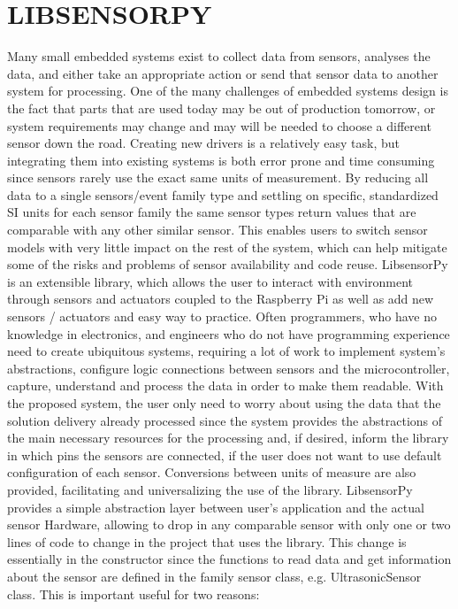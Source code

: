 \documentclass{acm_proc_article-sp}
\begin{document}
\section{LIBSENSORPY}
\label{sec:proposedModel}
Many small embedded systems exist to collect data from sensors, analyses the data, and either take an appropriate action or send that sensor data to another system for processing. One of the many challenges of embedded systems design is the fact that parts that are used today may be out of production tomorrow, or system requirements may change and may will be needed to choose a different sensor down the road.
\newline
\newline
Creating new drivers is a relatively easy task, but integrating them into existing systems is both error prone and time consuming since sensors rarely use the exact same units of measurement. By reducing all data to a single sensors/event family type and settling on specific, standardized SI units for each sensor family the same sensor types return values that are comparable with any other similar sensor. This enables users to switch sensor models with very little impact on the rest of the system, which can help mitigate some of the risks and problems of sensor availability and code reuse.
\newline
\newline
LibsensorPy is an extensible library, which allows the user to interact with environment through sensors and actuators coupled to the Raspberry Pi as well as add new sensors / actuators and easy way to practice. Often programmers, who have no knowledge in electronics, and engineers who do not have programming experience need to create ubiquitous systems, requiring a lot of work to implement system's abstractions, configure logic connections between sensors and the microcontroller, capture, understand and process the data in order to make them readable.
\newline
\newline 
With the proposed system, the user only need to worry about using the data that the solution delivery already processed since the system provides the abstractions of the main necessary resources for the processing and, if desired, inform the library in which pins the sensors are connected, if the user does not want to use default configuration of each sensor. Conversions between units of measure are also provided, facilitating and universalizing the use of the library.
\newline
\newline 
LibsensorPy provides a simple abstraction layer between user's application and the actual sensor Hardware, allowing to drop in any comparable sensor with only one or two lines of code to change in the project that uses the library. This change is essentially in the constructor since the functions to read data and get information about the sensor are defined in the family sensor class, e.g. UltrasonicSensor class.
\newline
\newline
This is important useful for two reasons:
\end{document}
